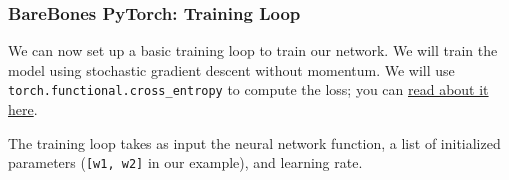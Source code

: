 \documentclass[11pt]{article}
\begin{document}
    \hypertarget{barebones-pytorch-training-loop}{%
\subsubsection{BareBones PyTorch: Training
Loop}\label{barebones-pytorch-training-loop}}

We can now set up a basic training loop to train our network. We will
train the model using stochastic gradient descent without momentum. We
will use \texttt{torch.functional.cross\_entropy} to compute the loss;
you can
\href{http://pytorch.org/docs/stable/nn.html\#cross-entropy}{read about
it here}.

The training loop takes as input the neural network function, a list of
initialized parameters (\texttt{{[}w1,\ w2{]}} in our example), and
learning rate.
\end{document}
